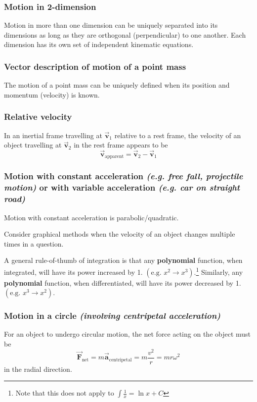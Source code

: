 \documentclass[11pt]{article}
\numberwithin{equation}{section}
\newcommand{\bvec}[1]{\boldsymbol{\vec{#1}}}
\begin{document}
			\subsubsection{Motion in 2-dimension}
				Motion in more than one dimension can be uniquely separated into its dimensions as long as they are orthogonal (perpendicular) to one another. Each dimension has its own set of independent kinematic equations.
			\subsubsection{Vector description of motion of a point mass}
				The motion of a point mass can be uniquely defined when its position and momentum (velocity) is known.
			\subsubsection{Relative velocity}
				In an inertial frame travelling at $\bvec{v}_1$ relative to a rest frame, the velocity of an object travelling at $\bvec{v}_2$ in the rest frame appears to be $$\bvec{v}_{\text{apparent}}=\bvec{v}_2-\bvec{v}_1$$
			\subsubsection{Motion with constant acceleration {\small \normalfont \em (e.g. free fall, projectile motion)} or with variable acceleration {\small \normalfont \em (e.g. car on straight road)}}
				Motion with constant acceleration is parabolic/quadratic.
				
				Consider graphical methods when the velocity of an object changes multiple times in a question.
				
				A general rule-of-thumb of integration is that any \textbf{polynomial} function, when integrated, will have its power increased by 1. $\left(\text{e.g. } x^2 \rightarrow x^3\right)$.\footnote{Note that this does not apply to $\int\frac{1}{x}=\ln x + C$} Similarly, any \textbf{polynomial} function, when differentiated, will have its power decreased by 1. $\left(\text{e.g. } x^3 \rightarrow x^2\right)$.
			\subsubsection{Motion in a circle {\small \normalfont \em (involving centripetal acceleration)}}
				For an object to undergo circular motion, the net force acting on the object must be
				\begin{equation*}
					\bvec{F}_{\text{net}} = m\bvec{a}_{\text{centripetal}} = m\frac{v^2}{r} = mr\omega^2
				\end{equation*}
				in the radial direction.
				
\end{document}
